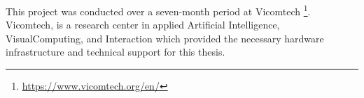 This project was conducted over a seven-month period at Vicomtech  \footnote{\url{https://www.vicomtech.org/en/}}. Vicomtech, is a research center in applied Artificial Intelligence, VisualComputing, and Interaction which provided the necessary hardware infrastructure and technical support for this thesis.

